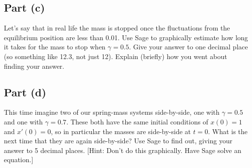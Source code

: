 \documentclass[letterpaper, 12pt]{amsart}
\theoremstyle{definition}  %
\begin{document}
		\subsection*{Part (c)}
		Let’s say that in real life the mass is stopped once the fluctuations from the equilibrium position are less than 0.01. 
		Use Sage to graphically estimate how long it takes for the mass to stop when $\gamma = 0.5$. 
		Give your answer to one decimal place (so something like 12.3, not just 12). 
		Explain (briefly) how you went about finding your answer.

		\subsection*{Part (d)}
		This time imagine two of our spring-mass systems side-by-side, one with $\gamma = 0.5$ and one with $\gamma = 0.7$. 
		These both have the same initial conditions of $x(0) = 1$ and $x'(0) = 0$, so in particular the masses are side-by-side at $t = 0$. 
		What is the next time that they are again side-by-side? 
		Use Sage to find out, giving your answer to 5 decimal places. 
		[Hint: Don’t do this graphically. 
		Have Sage solve an equation.]
\end{document}
